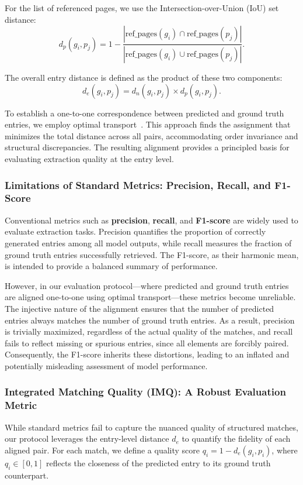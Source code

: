 For the list of referenced pages, we use the Intersection-over-Union (IoU) set distance:
$$
d_p(g_i, p_j) = 1 - \frac{|\text{ref\_pages}(g_i) \cap \text{ref\_pages}(p_j)|}{|\text{ref\_pages}(g_i) \cup \text{ref\_pages}(p_j)|}.
$$

The overall entry distance is defined as the product of these two components:
$$
d_e(g_i, p_j) = d_n(g_i, p_j) \times d_p(g_i, p_j).
$$

To establish a one-to-one correspondence between predicted and ground truth entries, we employ optimal transport~\cite{peyré2020computationaloptimaltransport}. This approach finds the assignment that minimizes the total distance across all pairs, accommodating order invariance and structural discrepancies. The resulting alignment provides a principled basis for evaluating extraction quality at the entry level.


\subsubsection{Limitations of Standard Metrics: Precision, Recall, and F1-Score}

Conventional metrics such as \textbf{precision}, \textbf{recall}, and \textbf{F1-score} are widely used to evaluate extraction tasks. Precision quantifies the proportion of correctly generated entries among all model outputs, while recall measures the fraction of ground truth entries successfully retrieved. The F1-score, as their harmonic mean, is intended to provide a balanced summary of performance.

However, in our evaluation protocol—where predicted and ground truth entries are aligned one-to-one using optimal transport—these metrics become unreliable. The injective nature of the alignment ensures that the number of predicted entries always matches the number of ground truth entries. As a result, precision is trivially maximized, regardless of the actual quality of the matches, and recall fails to reflect missing or spurious entries, since all elements are forcibly paired. Consequently, the F1-score inherits these distortions, leading to an inflated and potentially misleading assessment of model performance.

\subsubsection{Integrated Matching Quality (IMQ): A Robust Evaluation Metric}

While standard metrics fail to capture the nuanced quality of structured matches, our protocol leverages the entry-level distance $d_e$ to quantify the fidelity of each aligned pair. For each match, we define a quality score $q_i = 1 - d_e(g_i, p_i)$, where $q_i \in [0, 1]$ reflects the closeness of the predicted entry to its ground truth counterpart.

